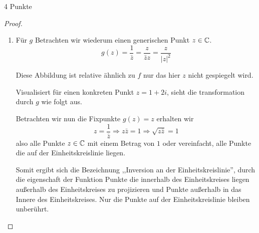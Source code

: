 \documentclass{../problemset}
\begin{document}
\begin{problem}[Einheitskreis]{4 Punkte}
\begin{proof}
\begin{enumerate}
		\item Für $g$ Betrachten wir wiederum einen generischen Punkt $z \in \mathbb{C}$. \[
			      g(z) = \frac{1}{\bar{z}} = \frac{z}{\bar{z}z} = \frac{z}{{|z|}^2}
		      \]

		      Diese Abbildung ist relative ähnlich zu $f$ nur das hier $z$ nicht gespiegelt
		      wird.

		      Visualisiert für einen konkreten Punkt $z = 1 + 2i$, sieht die transformation
		      durch $g$ wie folgt aus.


		      Betrachten wir nun die Fixpunkte $g(z) = z$ erhalten wir \[
			      z = \frac{1}{\bar{z}} \Rightarrow z \bar{z} = 1 \Rightarrow \sqrt{z \bar{z}} = 1
		      \] also alle Punkte $z \in \mathbb{C}$ mit einem Betrag von $1$ oder vereinfacht,
		      alle Punkte die auf der Einheitskreislinie liegen.

		      Somit ergibt sich die Bezeichnung ,,Inversion an der Einheitskreislinie'',
		      durch die eigenschaft der Funktion Punkte die innerhalb des Einheitskreises
		      liegen außerhalb des Einheitskreises zu projizieren und Punkte außerhalb in das
		      Innere des Einheitskreises. Nur die Punkte auf der Einheitskreislinie bleiben
		      unberührt.



\end{enumerate}
\end{proof}
\end{problem}
\end{document}
